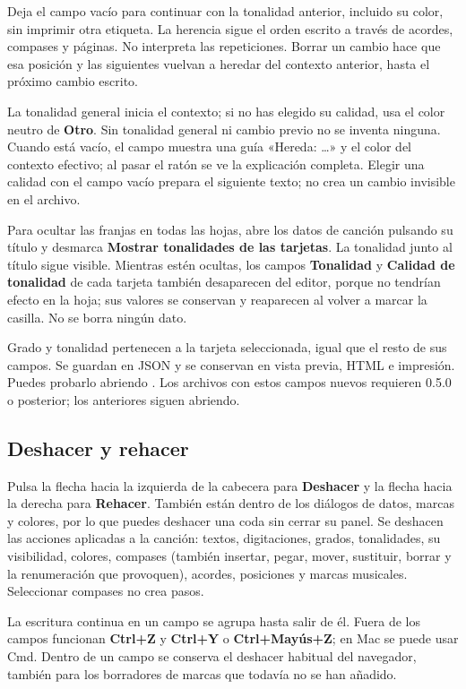 \documentclass[a4paper,11pt]{article}
\let\originaltexttt\texttt
\renewcommand{\texttt}[1]{\originaltexttt{\seqsplit{#1}}}
\begin{document}
Deja el campo vacío para continuar con la tonalidad anterior, incluido
su color, sin imprimir otra etiqueta. La herencia sigue el orden escrito
a través de acordes, compases y páginas. No interpreta las repeticiones.
Borrar un cambio hace que esa posición y las siguientes vuelvan a
heredar del contexto anterior, hasta el próximo cambio escrito.

La tonalidad general inicia el contexto; si no has elegido su calidad,
usa el color neutro de \textbf{Otro}. Sin tonalidad general ni cambio
previo no se inventa ninguna. Cuando está vacío, el campo muestra una
guía «Hereda: \ldots» y el color del contexto efectivo; al pasar el
ratón se ve la explicación completa. Elegir una calidad con el campo
vacío prepara el siguiente texto; no crea un cambio invisible en el
archivo.

Para ocultar las franjas en todas las hojas, abre los datos de canción
pulsando su título y desmarca \textbf{Mostrar tonalidades de las
tarjetas}. La tonalidad junto al título sigue visible. Mientras estén
ocultas, los campos \textbf{Tonalidad} y \textbf{Calidad de tonalidad}
de cada tarjeta también desaparecen del editor, porque no tendrían
efecto en la hoja; sus valores se conservan y reaparecen al volver a
marcar la casilla. No se borra ningún dato.

Grado y tonalidad pertenecen a la tarjeta seleccionada, igual que el
resto de sus campos. Se guardan en JSON y se conservan en vista previa,
HTML e impresión. Puedes probarlo abriendo
\texttt{examples/textos-tonalidades.json}. Los archivos con estos campos
nuevos requieren 0.5.0 o posterior; los anteriores siguen abriendo.

\subsection{Deshacer y rehacer}\label{deshacer-y-rehacer}

Pulsa la flecha hacia la izquierda de la cabecera para \textbf{Deshacer}
y la flecha hacia la derecha para \textbf{Rehacer}. También están dentro
de los diálogos de datos, marcas y colores, por lo que puedes deshacer
una coda sin cerrar su panel. Se deshacen las acciones aplicadas a la
canción: textos, digitaciones, grados, tonalidades, su visibilidad,
colores, compases (también insertar, pegar, mover, sustituir, borrar y
la renumeración que provoquen), acordes, posiciones y marcas musicales.
Seleccionar compases no crea pasos.

La escritura continua en un campo se agrupa hasta salir de él. Fuera de
los campos funcionan \textbf{Ctrl+Z} y \textbf{Ctrl+Y} o
\textbf{Ctrl+Mayús+Z}; en Mac se puede usar Cmd. Dentro de un campo se
conserva el deshacer habitual del navegador, también para los borradores
de marcas que todavía no se han añadido.
\end{document}

